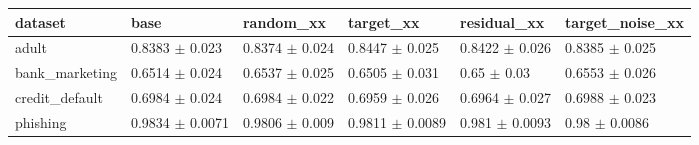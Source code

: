 \begin{tabular}{llllll}
\toprule
dataset & base & random\_xx & target\_xx & residual\_xx & target\_noise\_xx \\
\midrule
adult & 0.8383 $\pm$ 0.023 & 0.8374 $\pm$ 0.024 & 0.8447 $\pm$ 0.025 & 0.8422 $\pm$ 0.026 & 0.8385 $\pm$ 0.025 \\
bank\_marketing & 0.6514 $\pm$ 0.024 & 0.6537 $\pm$ 0.025 & 0.6505 $\pm$ 0.031 & 0.65 $\pm$ 0.03 & 0.6553 $\pm$ 0.026 \\
credit\_default & 0.6984 $\pm$ 0.024 & 0.6984 $\pm$ 0.022 & 0.6959 $\pm$ 0.026 & 0.6964 $\pm$ 0.027 & 0.6988 $\pm$ 0.023 \\
phishing & 0.9834 $\pm$ 0.0071 & 0.9806 $\pm$ 0.009 & 0.9811 $\pm$ 0.0089 & 0.981 $\pm$ 0.0093 & 0.98 $\pm$ 0.0086 \\
\bottomrule
\end{tabular}
